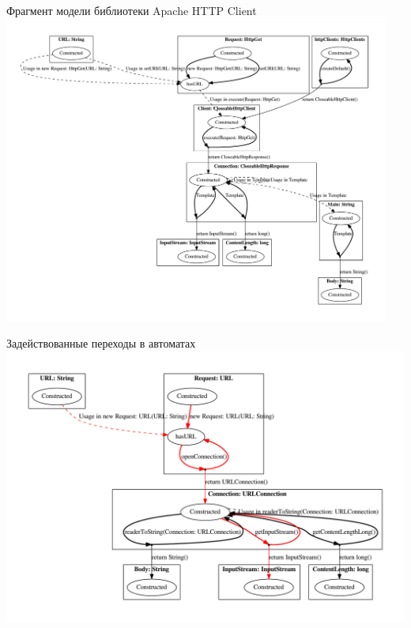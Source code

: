 \documentclass[12pt]{beamer}
\begin{document}
\begin{frame}{Фрагмент модели библиотеки Apache HTTP Client}
	\includegraphics[width=0.95\textwidth]{apache.pdf}
\end{frame}

\begin{frame}{Задействованные переходы в автоматах}
	\includegraphics[width=\textwidth]{extracted_java.pdf}
\end{frame}

\end{document}
